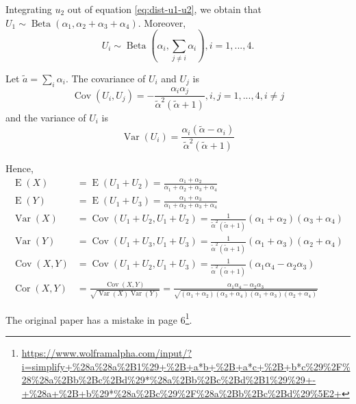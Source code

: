 \documentclass[a4paper, notitlepage, 11pt]{article}
\newcommand{\betadist}{\operatorname{Beta}}
\theoremstyle{definition}
\theoremstyle{remark}
\begin{document}
Integrating $u_2$ out of equation \eqref{eq:dist-u1-u2}, we obtain that $U_1
\sim \betadist(\alpha_1, \alpha_2+\alpha_3+\alpha_4)$. Moreover,
$$U_i \sim \betadist(\alpha_i, \sum_{j\neq i} \alpha_i), i = 1,...,4.$$ 

Let $\tilde{a} = \sum_i \alpha_i$. The covariance of $U_i$ and $U_j$ is \cite[]{lin2016dirichlet} 
\begin{equation}
  \operatorname{Cov}(U_i, U_j) = - \frac{\alpha_i\alpha_j}{\tilde{\alpha}^2(\tilde{\alpha}+1)}, i,j = 1,...,4, i \neq j
\end{equation} 
and the variance of $U_i$ is 
\begin{equation}
  \operatorname{Var}(U_i) = \frac{\alpha_i(\tilde{\alpha}-\alpha_i)}{\tilde{\alpha}^2(\tilde{\alpha}+1)}
\end{equation}

Hence, 
\begin{align*}
    \operatorname{E}(X) &= \operatorname{E}(U_1 + U_2) = \frac{\alpha_1+\alpha_2}{\alpha_1+\alpha_2+\alpha_3+\alpha_4} \\
    \operatorname{E}(Y) &= \operatorname{E}(U_1 + U_3) = \frac{\alpha_1+\alpha_3}{\alpha_1+\alpha_2+\alpha_3+\alpha_4} \\
    \operatorname{Var}(X) &= \operatorname{Cov}(U_1+U_2, U_1+U_2) = \frac{1}{\tilde{\alpha}^2(\tilde{\alpha}+1)}(\alpha_1+\alpha_2)(\alpha_3 + \alpha_4) \\
    \operatorname{Var}(Y) &= \operatorname{Cov}(U_1+U_3, U_1+U_3) = \frac{1}{\tilde{\alpha}^2(\tilde{\alpha}+1)}(\alpha_1+\alpha_3)(\alpha_2 + \alpha_4)  \\ 
    \operatorname{Cov}(X,Y) &= \operatorname{Cov}(U_1+U_2, U_1+U_3) = \frac{1}{\tilde{\alpha}^2(\tilde{\alpha}+1)}(\alpha_1\alpha_4 - \alpha_2\alpha_3) \\
    \operatorname{Cor}(X,Y) &= \frac{\operatorname{Cov}(X,Y)}{\sqrt{\operatorname{Var}(X)\operatorname{Var}(Y)}} = \frac{\alpha_1\alpha_4 - \alpha_2\alpha_3}{\sqrt{(\alpha_1+\alpha_2)(\alpha_3+\alpha_4)(\alpha_1+\alpha_3)(\alpha_2+\alpha_4)}}
\end{align*}

The original paper has a mistake in page 6\footnote{\url{https://www.wolframalpha.com/input/?i=simplify+\%28a\%28a\%2B1\%29+\%2B+a*b+\%2B+a*c+\%2B+b*c\%29\%2F\%28\%28a\%2Bb\%2Bc\%2Bd\%29*\%28a\%2Bb\%2Bc\%2Bd\%2B1\%29\%29+-+\%28a+\%2B+b\%29*\%28a\%2Bc\%29\%2F\%28a\%2Bb\%2Bc\%2Bd\%29\%5E2+}}.


 
\end{document}
